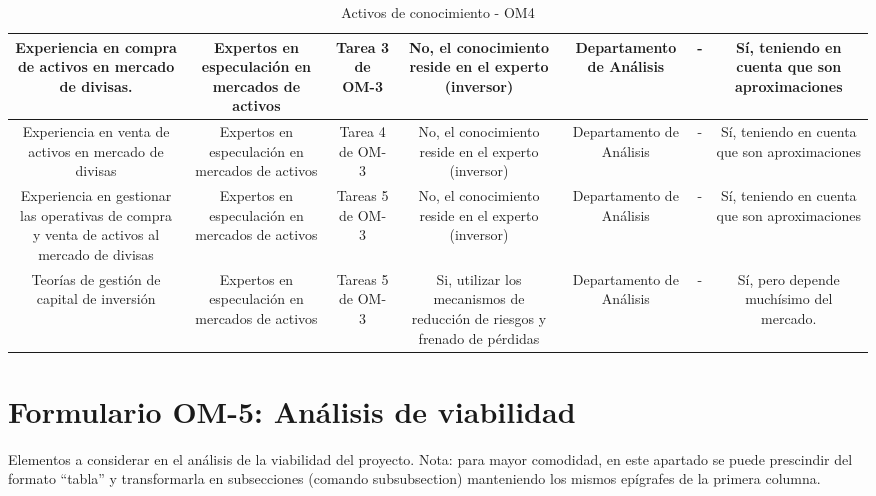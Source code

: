 \begin{table}[H]
{\begin{tabular}{|c|c|c|c|c|c|c|}
      \hline
      \multicolumn{1}{|p{4.0cm}|}{\centering Experiencia en compra de activos en mercado de divisas.} & \multicolumn{1}{|p{3.0cm}|}{\centering Expertos en especulación en mercados de activos} & \multicolumn{1}{|p{3.0cm}|}{\centering Tarea 3 de OM-3} & \multicolumn{1}{|p{3.0cm}|}{\centering No, el conocimiento reside en el experto (inversor)} &  Departamento de Análisis  & - & \multicolumn{1}{|p{3.0cm}|}{\centering Sí, teniendo en cuenta que son aproximaciones} \\
      \hline
      \multicolumn{1}{|p{4.0cm}|}{\centering Experiencia en venta de activos en mercado de divisas} & \multicolumn{1}{|p{3.0cm}|}{\centering Expertos en especulación en mercados de activos} & \multicolumn{1}{|p{3.0cm}|}{\centering Tarea 4 de OM-3} & \multicolumn{1}{|p{3.0cm}|}{\centering No, el conocimiento reside en el experto (inversor)} &  Departamento de Análisis  & - & \multicolumn{1}{|p{3.0cm}|}{\centering Sí, teniendo en cuenta que son aproximaciones} \\
      \hline
      \multicolumn{1}{|p{4.0cm}|}{\centering Experiencia en gestionar las operativas de compra y venta de activos al mercado de divisas} & \multicolumn{1}{|p{3.0cm}|}{\centering Expertos en especulación en mercados de activos} & \multicolumn{1}{|p{3.0cm}|}{\centering Tareas 5 de OM-3} & \multicolumn{1}{|p{3.0cm}|}{\centering No, el conocimiento reside en el experto (inversor)} &  Departamento de Análisis  & - & \multicolumn{1}{|p{3.0cm}|}{\centering Sí, teniendo en cuenta que son aproximaciones} \\
      \hline
      \multicolumn{1}{|p{4.0cm}|}{\centering Teorías de gestión de capital de inversión} & \multicolumn{1}{|p{3.0cm}|}{\centering Expertos en especulación en mercados de activos} & \multicolumn{1}{|p{3.0cm}|}{\centering Tareas 5 de OM-3} & \multicolumn{1}{|p{3.0cm}|}{\centering Si, utilizar los mecanismos de reducción de riesgos y frenado de pérdidas} &  Departamento de Análisis  & - & \multicolumn{1}{|p{3.0cm}|}{\centering Sí, pero depende muchísimo del mercado.} \\
      \hline
    \end{tabular}
  }
	\caption{\label{tab:OM4}Activos de conocimiento - OM4}
\end{table}


\section{Formulario OM-5: Análisis de viabilidad}


Elementos a considerar en el análisis de la viabilidad del proyecto. Nota: para mayor comodidad, en este apartado se puede prescindir del formato ``tabla'' y transformarla en subsecciones (comando subsubsection) manteniendo los mismos epígrafes de la primera columna.

